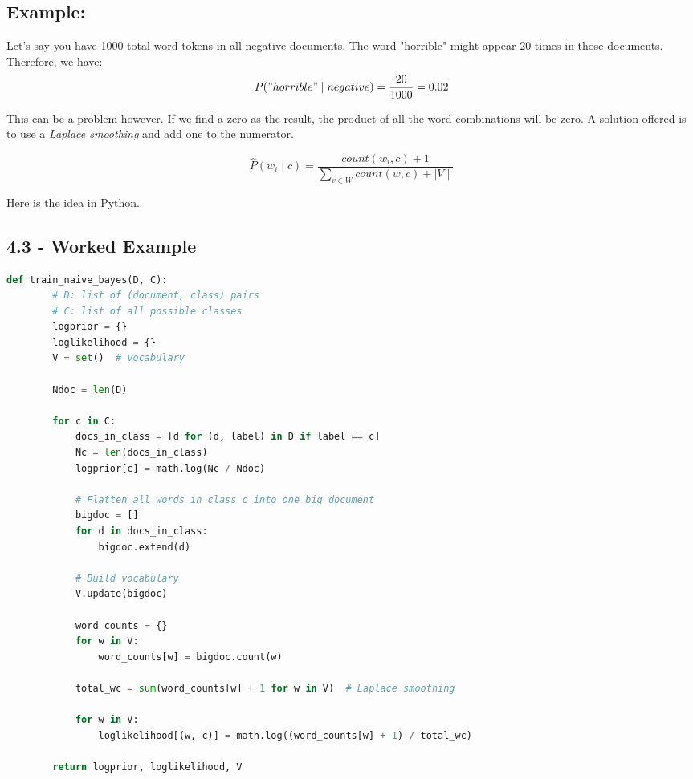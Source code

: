 \documentclass{article}
\begin{document}
\subsection{Example:}
Let's say you have 1000 total word tokens in all negative documents. The word "horrible" might appear 20 times in those documents.
Therefore, we have:
\[
    P("horrible" \mid negative) = \frac{20}{1000} = 0.02
\]

This can be a problem however. If we find a zero as the result, the product of all the word combinations will be zero. A solution offered is to
use a \textit{Laplace smoothing} and add one to the numerator.

\[
    \hat{P}(w_i \mid c) = \frac{count(w_i, c) + 1}{\sum_{v \in W}{count(w,c) + \mid V \mid}}
\]


Here is the idea in Python.

\subsection{4.3 - Worked Example}

\begin{lstlisting}[language=Python]
    def train_naive_bayes(D, C):
        # D: list of (document, class) pairs
        # C: list of all possible classes
        logprior = {}
        loglikelihood = {}
        V = set()  # vocabulary
    
        Ndoc = len(D)
    
        for c in C:
            docs_in_class = [d for (d, label) in D if label == c]
            Nc = len(docs_in_class)
            logprior[c] = math.log(Nc / Ndoc)
    
            # Flatten all words in class c into one big document
            bigdoc = []
            for d in docs_in_class:
                bigdoc.extend(d)
            
            # Build vocabulary
            V.update(bigdoc)
    
            word_counts = {}
            for w in V:
                word_counts[w] = bigdoc.count(w)
    
            total_wc = sum(word_counts[w] + 1 for w in V)  # Laplace smoothing
    
            for w in V:
                loglikelihood[(w, c)] = math.log((word_counts[w] + 1) / total_wc)
    
        return logprior, loglikelihood, V
    \end{lstlisting}
\end{document}
